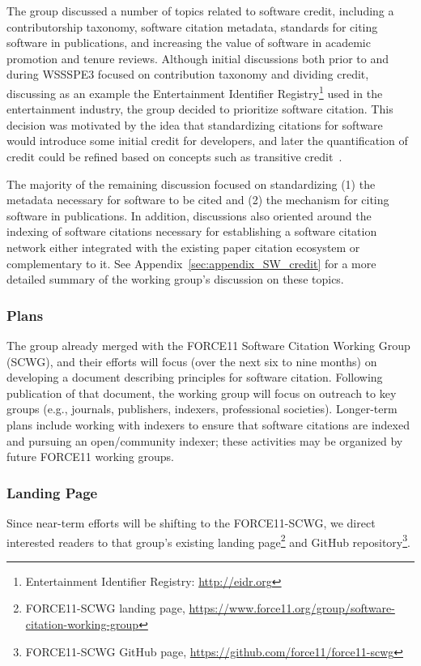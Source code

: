 The group discussed a number of topics related to software credit, including a contributorship taxonomy, software citation metadata, standards for citing software in publications, and increasing the value of software in academic promotion and tenure reviews.
Although initial discussions both prior to and during WSSSPE3 focused on contribution taxonomy and dividing credit, discussing as an example the Entertainment Identifier Registry\footnote{Entertainment Identifier Registry: \url{http://eidr.org}} used in the entertainment industry, the group decided to prioritize software citation.
This decision was motivated by the idea that standardizing citations for software would introduce some initial credit for developers, and later the quantification of credit could be refined based on concepts such as transitive credit~\cite{wssspe2_katz,Katz:2014_tc}.

The majority of the remaining discussion focused on standardizing (1) the metadata necessary for software to be cited and (2) the mechanism for citing software in publications.
In addition, discussions also oriented around the indexing of software citations necessary for establishing a software citation network either integrated with the existing paper citation ecosystem or complementary to it.
See Appendix~\ref{sec:appendix_SW_credit} for a more detailed summary of the working group's discussion on these topics.

\subsubsection{Plans}

The group already merged with the FORCE11 Software Citation Working Group (SCWG), and their efforts will focus (over the next six to nine months) on developing a document describing principles for software citation.
Following publication of that document, the working group will focus on outreach to key groups (e.g., journals, publishers, indexers, professional societies).
Longer-term plans include working with indexers to ensure that software citations are indexed and pursuing an open\slash community indexer; these activities may be organized by future FORCE11 working groups.

\subsubsection{Landing Page}

Since near-term efforts will be shifting to the FORCE11-SCWG, we direct interested readers to that group's existing landing page\footnote{FORCE11-SCWG landing page, \url{https://www.force11.org/group/software-citation-working-group}} and GitHub repository\footnote{FORCE11-SCWG GitHub page,  \url{https://github.com/force11/force11-scwg}}.
